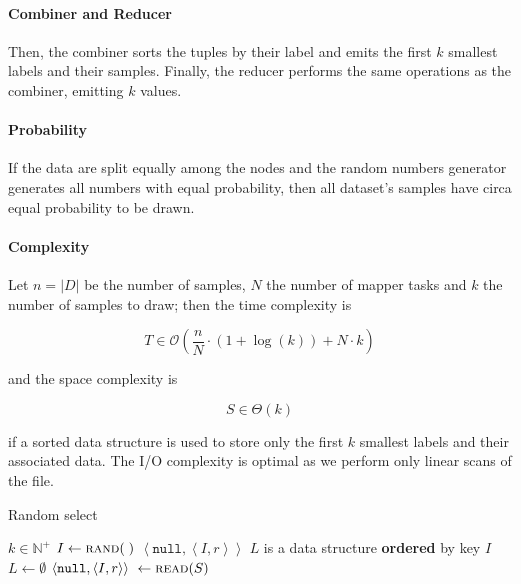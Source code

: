 \documentclass[parskip=full]{report}
\begin{document}
\paragraph{Combiner and Reducer}
Then, the combiner sorts the tuples by their label and emits the first $k$
smallest labels and their samples. Finally, the reducer performs the same
operations as the combiner, emitting $k$ values.

\paragraph{Probability}
If the data are split equally among the nodes and the random numbers generator generates all numbers with equal probability, then all dataset's samples have circa equal probability to be drawn.

\paragraph{Complexity}
Let $n = |D|$ be the number of samples, $N$ the number of mapper tasks and $k$ 
the number of samples to draw; then the time complexity is

\[
T \in \mathcal{O} \left(\dfrac{n}{N} \cdot \left(1 + \log(k)\right) + N\cdot k \right)
\]

and the space complexity is

\[
S \in \Theta \left(k\right)
\]

if a sorted data structure is used to store only the first $k$ smallest labels
and their associated data. The I/O complexity is optimal as we perform only linear scans of the file.

\begin{algorithm}[H]
	\caption{Random select}\label{alg:random_map}
	\begin{algorithmic}
		\Require $k \in \mathbb{N}^+$
			\State $I \gets \Call{rand}{\;}$
			\State \Return $\left< \texttt{null}, \left< I, r\right> \right>$
		\EndProcedure
		\vspace{.25cm}
			\State $L$ is a data structure \textbf{ordered} by key $I$
			\State $L \gets \emptyset$
				\State $\left< \texttt{null}, \left< I, r\right> \right> \
					\gets \Call{read}{S}$
				\State {}
					\State {}
				\EndIf

				\State {}
			\EndWhile
				\State {}
			\EndFor
		\EndProcedure
		\vspace{.25cm}
			\State {} 
		\EndProcedure
	\end{algorithmic}
\end{algorithm}
\end{document}
